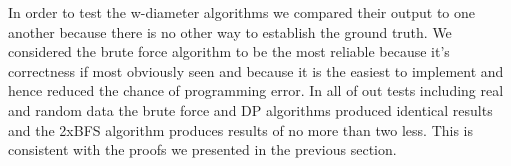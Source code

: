 In order to test the w-diameter algorithms we compared their output to one another because there is no other way to establish the ground truth. We considered the brute force algorithm to be the most reliable because it's correctness if most obviously seen and because it is the easiest to implement and hence reduced the chance of programming error. In all of out tests including real and random data the brute force and DP algorithms produced identical results and the 2xBFS algorithm produces results of no more than two less. This is consistent with the proofs we presented in the previous section.


